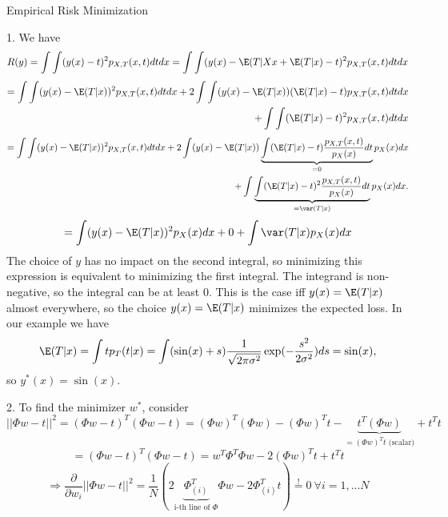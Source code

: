 \documentclass[english]{exercisesheet}
\begin{document}
\newpage
\begin{nexercise}{Empirical Risk Minimization}
\end{nexercise}
\begin{solution}
 1. We have
 \begin{equation*}
  R(y)=\int\int (y(x)-t)^2 p_{X,T}(x,t) dtdx=\int\int (y(x)-\E(T|Xx+\E(T|x)-t)^2 p_{X,T}(x,t) dt dx
 \end{equation*}
\begin{align*}
 =\int\int (y(x)-\E(T|x))^2 p_{X,T}(x,t)dtdx+2\int\int (y(x)-\E(T|x))(\E(T|x)-t)p_{X,T}(x,t) dtdx \\+\int\int (\E(T|x)-t)^2 p_{X,T}(x,t)dtdx
\end{align*}
\begin{align*}
 =\int\int (y(x)-\E(T|x))^2 p_{X,T}(x,t)dtdx+2\int (y(x)-\E(T|x))\underbrace{\int (\E(T|x)-t)\frac{p_{X,T}(x,t)}{p_X(x)} dt}_{=0}p_X(x)dx \\+\int\underbrace{\int (\E(T|x)-t)^2 \frac{p_{X,T}(x,t)}{p_X(x)}dt}_{=\var(T|x)}p_X(x)dx.
\end{align*}
\begin{equation}\label{eq1}
 =\int (y(x)-\E(T|x))^2 p_X(x)dx+0+\int \var(T|x) p_X(x)dx
\end{equation}
The choice of $y$ has no impact on the second integral, so minimizing this expression is equivalent to minimizing the first integral. The integrand is non-negative, so the integral can be at least 0. This is the case iff $y(x)=\E(T|x)$ almost everywhere, so the choice $y(x)=\E(T|x)$ minimizes the expected loss. In our example we have
\begin{equation*}
 \E(T|x)=\int t p_T(t|x)=\int (\sin(x)+s)\frac{1}{\sqrt{2\pi\sigma^2}}\exp(-\frac{s^2}{2\sigma^2})ds=\sin(x),
\end{equation*}
so $y^*(x)=\sin(x)$.\\
\par2. To find the minimizer $w^*$, consider
\begin{equation*}
 ||\Phi w-t||^2=(\Phi w-t)^T(\Phi w-t)=(\Phi w)^T(\Phi w)-(\Phi w)^Tt -\underbrace{t^T(\Phi w)}_{=(\Phi w)^Tt\text{ (scalar)}}+t^Tt
\end{equation*}
\begin{equation*}
 =(\Phi w-t)^T(\Phi w-t)=w^T\Phi^T\Phi w-2(\Phi w)^Tt +t^Tt
\end{equation*}
\begin{equation*}
 \Rightarrow \frac{\partial}{\partial w_i} ||\Phi w-t||^2= \frac{1}{N}\left( 2\underbrace{\Phi_{(i)}^T}_{\text{i-th line of $\Phi$}}\Phi w-2\Phi_{(i)}^Tt\right)\stackrel{!}{=}0 ~ \forall i=1,...N

\end{equation*}
\end{solution}
\end{document}
